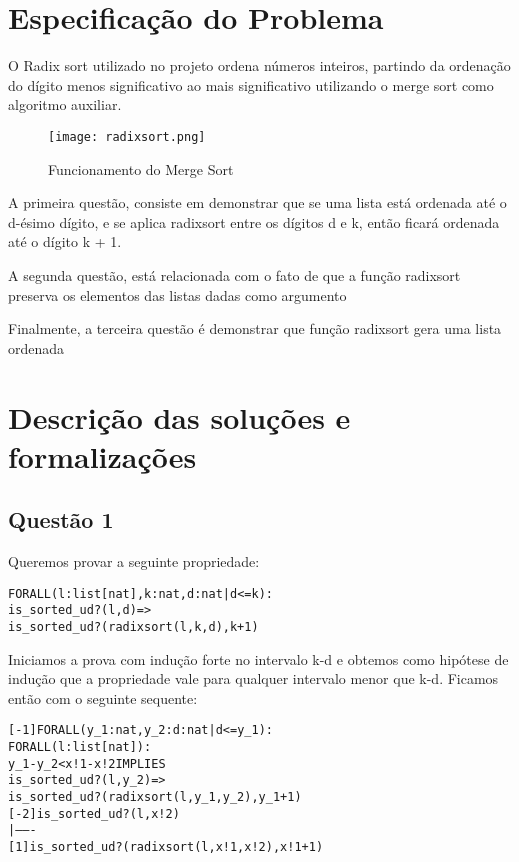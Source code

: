 \documentclass[a4paper, 12pt]{article}
\begin{document}
\section{Especificação do Problema}
O Radix sort utilizado no projeto ordena números inteiros, partindo da ordenação do dígito menos significativo ao mais significativo utilizando o merge sort como algoritmo auxiliar.

\begin{figure}[!h]
    \centering
    \texttt{[image: radixsort.png]}
    \caption{Funcionamento do Merge Sort}
\end{figure}

A primeira questão, consiste em demonstrar que se uma lista está ordenada até o d-ésimo dígito,
e se aplica radixsort entre os dígitos d e k, então ficará ordenada até o dígito k + 1.

A segunda questão, está relacionada com o fato de que a função radixsort preserva os elementos das listas dadas como argumento

Finalmente, a terceira questão é demonstrar que função radixsort gera uma lista ordenada

\section{Descrição das soluções e formalizações}

\subsection{Questão 1}
Queremos provar a seguinte propriedade:
\begin{alltt}
 FORALL(l : list[nat], k : nat, d:nat | d <= k) :
     is_sorted_ud?(l,d) =>
        is_sorted_ud?(radixsort(l, k, d), k+1)
\end{alltt}


Iniciamos a prova com indução forte no intervalo k-d e obtemos como hipótese de indução que a propriedade vale para qualquer intervalo menor que k-d.
Ficamos então com o seguinte sequente:


\begin{alltt}
 [-1]  FORALL (y_1: nat, y_2: {d: nat | d <= y_1}):
        FORALL (l: list[nat]):
          y_1 - y_2 < x!1 - x!2 IMPLIES
           is_sorted_ud?(l, y_2) =>
            is_sorted_ud?(radixsort(l, y_1, y_2), y_1 + 1)
 [-2]  is_sorted_ud?(l, x!2)
  |-------
 [1]   is_sorted_ud?(radixsort(l, x!1, x!2), x!1 + 1)
\end{alltt}
\end{document}
